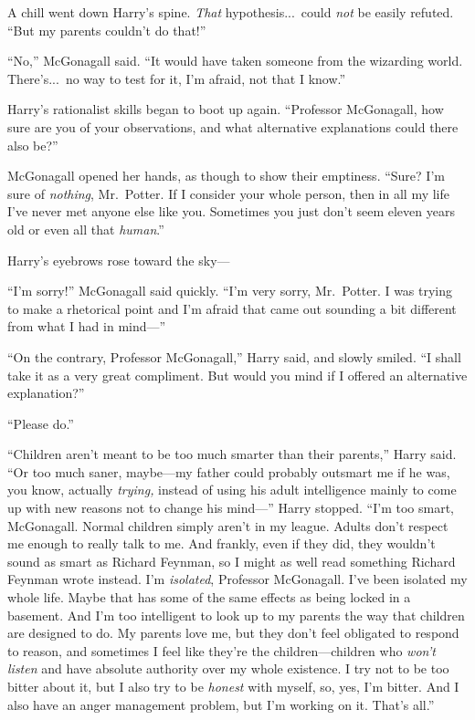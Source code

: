 A chill went down Harry’s spine. \emph{That} hypothesis...\ could \emph{not} be easily refuted. “But my parents couldn’t do that!”

“No,” McGonagall said. “It would have taken someone from the wizarding world. There’s...\ no way to test for it, I’m afraid, not that I know.”

Harry’s rationalist skills began to boot up again. “Professor McGonagall, how sure are you of your observations, and what alternative explanations could there also be?”

McGonagall opened her hands, as though to show their emptiness. “Sure? I’m sure of \emph{nothing}, Mr.~Potter. If I consider your whole person, then in all my life I’ve never met anyone else like you. Sometimes you just don’t seem eleven years old or even all that \emph{human}.”

Harry’s eyebrows rose toward the sky—

“I’m sorry!” McGonagall said quickly. “I’m very sorry, Mr.~Potter. I was trying to make a rhetorical point and I’m afraid that came out sounding a bit different from what I had in mind—”

“On the contrary, Professor McGonagall,” Harry said, and slowly smiled. “I shall take it as a very great compliment. But would you mind if I offered an alternative explanation?”

“Please do.”

“Children aren’t meant to be too much smarter than their parents,” Harry said. “Or too much saner, maybe—my father could probably outsmart me if he was, you know, actually \emph{trying,} instead of using his adult intelligence mainly to come up with new reasons not to change his mind—” Harry stopped. “I’m too smart, McGonagall. Normal children simply aren’t in my league. Adults don’t respect me enough to really talk to me. And frankly, even if they did, they wouldn’t sound as smart as Richard Feynman, so I might as well read something Richard Feynman wrote instead. I’m \emph{isolated}, Professor McGonagall. I’ve been isolated my whole life. Maybe that has some of the same effects as being locked in a basement. And I’m too intelligent to look up to my parents the way that children are designed to do. My parents love me, but they don’t feel obligated to respond to reason, and sometimes I feel like they’re the children—children who \emph{won’t listen} and have absolute authority over my whole existence. I try not to be too bitter about it, but I also try to be \emph{honest} with myself, so, yes, I’m bitter. And I also have an anger management problem, but I’m working on it. That’s all.”

